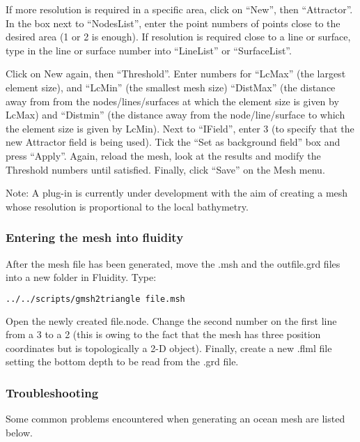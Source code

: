 If more resolution is required in a specific area, click on “New”, then “Attractor”. In the box next to “NodesList”, enter 
the point numbers of points close to the desired area (1 or 2 is enough). If resolution is required close to a line or surface, 
type in the line or surface number into “LineList” or “SurfaceList”. 

Click on New again, then “Threshold”. Enter numbers for “LcMax” (the largest element size), and “LcMin” (the smallest mesh size) 
“DistMax” (the distance away from from the nodes/lines/surfaces at which the element size is given by LcMax) and “Distmin” 
(the distance away from the node/line/surface to which the element size is given by LcMin). Next to “IField”, enter 3 
(to specify that the new Attractor field is being used). Tick the “Set as background field” box and press “Apply”. Again, 
reload the mesh, look at the results and modify the Threshold numbers until satisfied. Finally, click “Save” on the Mesh menu.

Note: A plug-in is currently under development with the aim of creating a mesh whose resolution is proportional to the local bathymetry.

\subsubsection{Entering the mesh into fluidity}

After the mesh file has been generated, move the .msh and the outfile.grd files into a new folder in Fluidity. Type:
\begin{lstlisting}[language = Bash]
	 ../../scripts/gmsh2triangle file.msh
\end{lstlisting}

Open the newly created file.node. Change the second number on the first line from a 3 to a 2 (this is owing to the fact that
the mesh has three position coordinates but is topologically a 2-D object). Finally, create a new .flml file setting the bottom depth
to be read from the .grd file.

\subsubsection{Troubleshooting}

Some common problems encountered when generating an ocean mesh are listed below.

